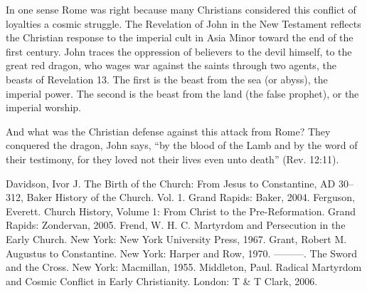 In one sense Rome was right because many Christians considered this conflict of loyalties a cosmic
struggle. The Revelation of John in the New Testament reflects the Christian response to the
imperial cult in Asia Minor toward the end of the first century. John traces the oppression of
believers to the devil himself, to the great red dragon, who wages war against the saints through
two agents, the beasts of Revelation 13. The first is the beast from the sea (or abyss), the
imperial power. The second is the beast from the land (the false prophet), or the imperial worship.

And what was the Christian defense against this attack from Rome? They conquered the dragon, John
says, “by the blood of the Lamb and by the word of their testimony, for they loved not their lives
even unto death” (Rev. 12:11).

\begin{readinglist}
\entry Davidson, Ivor J. The Birth of the Church: From Jesus to Constantine, AD 30–312, Baker
  History of the Church. Vol. 1. Grand Rapids: Baker, 2004.
\entry *Ferguson, Everett. Church History, Volume 1: From Christ to the Pre-Reformation. Grand
  Rapids: Zondervan, 2005.
\entry Frend, W. H. C. Martyrdom and Persecution in the Early Church. New York: New York University
  Press, 1967.
\entry Grant, Robert M. Augustus to Constantine. New York: Harper and Row, 1970.
\entry ———. The Sword and the Cross. New York: Macmillan, 1955.
\entry Middleton, Paul. Radical Martyrdom and Cosmic Conflict in Early Christianity. London: T \& T
  Clark, 2006.
\end{readinglist}

